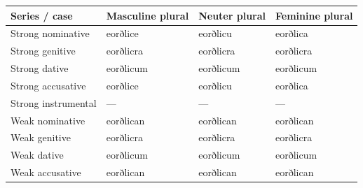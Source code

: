 \begin{tabular}{@{}>{\raggedright\arraybackslash}p{35.157mm}>{\raggedright\arraybackslash}p{28.195mm}>{\raggedright\arraybackslash}p{25.062mm}>{\raggedright\arraybackslash}p{27.151mm}@{}}
\toprule
\textbf{Series /\allowbreak{} case} & \textbf{Masculine plural} & \textbf{Neuter plural} & \textbf{Feminine plural} \\
\midrule
Strong nominative & eorðlice & eorðlicu & eorðlica \\
Strong genitive & eorðlicra & eorðlicra & eorðlicra \\
Strong dative & eorðlicum & eorðlicum & eorðlicum \\
Strong accusative & eorðlice & eorðlicu & eorðlica \\
Strong instrumental & — & — & — \\
Weak nominative & eorðlican & eorðlican & eorðlican \\
Weak genitive & eorðlicra & eorðlicra & eorðlicra \\
Weak dative & eorðlicum & eorðlicum & eorðlicum \\
Weak accusative & eorðlican & eorðlican & eorðlican \\
\bottomrule
\end{tabular}
\par\endgroup

